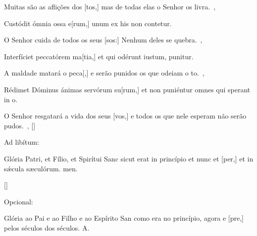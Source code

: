 {    {Muitas são as aflições dos [tos,] mas de todas elas o Senhor os livra.~\Antiphona},
  {\item {}Custódit ómnia ossa e[rum,] unum ex his non contetur.~\Antiphona}%
    {O Senhor cuida de todos os seus [sos:] Nenhum deles se quebra.~\Antiphona},
  {\item {}Interfíciet peccatórem ma[tia,] et qui odérunt iustum, puni\-tur.~\Antiphona}%
    {A maldade matará o peca[,] e serão punidos os que odeiam o to.~\Antiphona},
  {\item {}Rédimet Dóminus ánimas servórum su[rum,] et non puniéntur omnes qui sperant in o.~\Antiphona}%
    {O Senhor resgatará a vida dos seus [vos,] e todos os que nele esperam não serão pudos.~\Antiphona},
  []{\begin{rubrica}Ad libítum:\end{rubrica} Glória Patri, et Fílio, et Spirítui Sanc sicut erat in princípio et nunc et [per,] et in sǽcula sæculórum. men.~\Antiphona}%
    []{\begin{rubrica}Opcional:\end{rubrica} Glória ao Pai e ao Filho e ao Espírito San como era no princípio, agora e [pre,] pelos séculos dos séculos. A.~\Antiphona}
}
